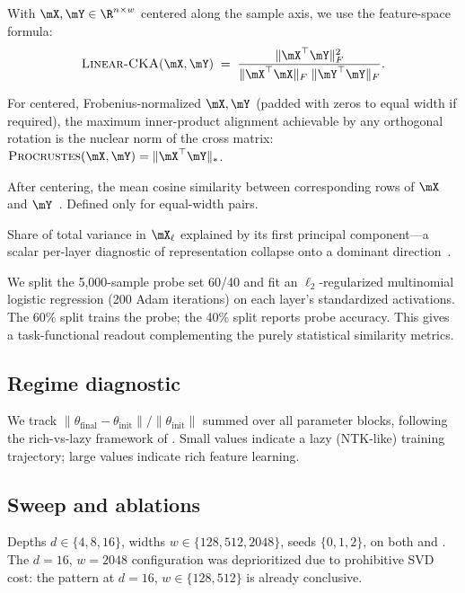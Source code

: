  With $\mX, \mY \in \R^{n \times w}$ centered along the sample axis, we use the feature-space formula:
\begin{equation}
    \ckam(\mX, \mY) \;=\; \frac{\|\mX^\top \mY\|_F^2}{\|\mX^\top \mX\|_F \; \|\mY^\top \mY\|_F}.
    \label{eq:cka}
\end{equation}

 For centered, Frobenius-normalized $\mX, \mY$ (padded with zeros to equal width if required), the maximum inner-product alignment achievable by any orthogonal rotation is the nuclear norm of the cross matrix: $\procrustes(\mX, \mY) = \|\mX^\top \mY\|_*$.

 After centering, the mean cosine similarity between corresponding rows of $\mX$ and $\mY$~\citep{jiang2024tracing}. Defined only for equal-width pairs.

 Share of total variance in $\mX_\ell$ explained by its first principal component---a scalar per-layer diagnostic of representation collapse onto a dominant direction~\citep{nguyen2022origins}.

 We split the 5{,}000-sample probe set 60/40 and fit an $\ell_2$-regularized multinomial logistic regression (200 Adam iterations) on each layer's standardized activations. The 60\% split trains the probe; the 40\% split reports probe accuracy. This gives a task-functional readout complementing the purely statistical similarity metrics.

\subsection{Regime diagnostic}

We track $\|\theta_{\mathrm{final}} - \theta_{\mathrm{init}}\|/\|\theta_{\mathrm{init}}\|$ summed over all parameter blocks, following the rich-vs-lazy framework of \citet{chizat2019global}. Small values indicate a lazy (NTK-like) training trajectory; large values indicate rich feature learning.

\subsection{Sweep and ablations}

 Depths $d\!\in\!\{4,8,16\}$, widths $w\!\in\!\{128, 512, 2048\}$, seeds $\{0,1,2\}$, on both \cifar and \mnist. The $d\!=\!16$, $w\!=\!2048$ configuration was deprioritized due to prohibitive SVD cost: the pattern at $d\!=\!16$, $w\!\in\!\{128, 512\}$ is already conclusive.

